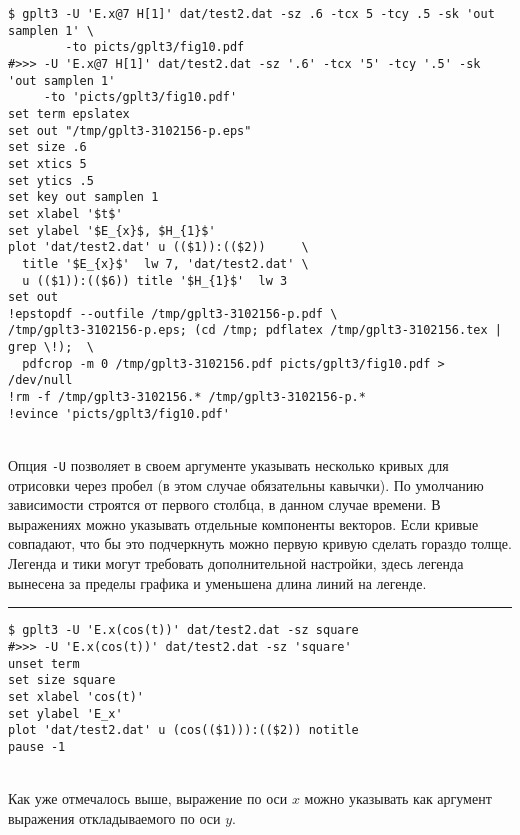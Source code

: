 \documentclass[12pt]{article}
\begin{document}
\vspace{3mm}
\noindent
\begin{minipage}[b]{.48\textwidth}
\small
\begin{verbatim}
$ gplt3 -U 'E.x@7 H[1]' dat/test2.dat -sz .6 -tcx 5 -tcy .5 -sk 'out samplen 1' \
        -to picts/gplt3/fig10.pdf
#>>> -U 'E.x@7 H[1]' dat/test2.dat -sz '.6' -tcx '5' -tcy '.5' -sk 'out samplen 1' 
     -to 'picts/gplt3/fig10.pdf'
set term epslatex 
set out "/tmp/gplt3-3102156-p.eps"
set size .6
set xtics 5
set ytics .5
set key out samplen 1
set xlabel '$t$'
set ylabel '$E_{x}$, $H_{1}$'
plot 'dat/test2.dat' u (($1)):(($2))     \
  title '$E_{x}$'  lw 7, 'dat/test2.dat' \
  u (($1)):(($6)) title '$H_{1}$'  lw 3 
set out
!epstopdf --outfile /tmp/gplt3-3102156-p.pdf \
/tmp/gplt3-3102156-p.eps; (cd /tmp; pdflatex /tmp/gplt3-3102156.tex | grep \!);  \
  pdfcrop -m 0 /tmp/gplt3-3102156.pdf picts/gplt3/fig10.pdf > /dev/null
!rm -f /tmp/gplt3-3102156.* /tmp/gplt3-3102156-p.*
!evince 'picts/gplt3/fig10.pdf'
\end{verbatim}
\end{minipage}
\raisebox{2cm}{\epsfig{file=picts/gplt3/fig10, width=.5\textwidth}}\\[5mm]
Опция \verb'-U' позволяет в своем аргументе указывать несколько кривых для отрисовки через пробел (в этом случае обязательны кавычки).
По умолчанию зависимости строятся от первого столбца, в данном случае времени. В выражениях можно указывать отдельные компоненты векторов.
Если кривые совпадают, что бы это подчеркнуть можно первую кривую сделать гораздо толще.
Легенда и тики могут требовать дополнительной настройки, здесь легенда вынесена за пределы графика и уменьшена длина линий на легенде.\\

\hrule %

\vspace{3mm}
\noindent
\begin{minipage}[b]{.73\textwidth}
\small
\begin{verbatim}
$ gplt3 -U 'E.x(cos(t))' dat/test2.dat -sz square
#>>> -U 'E.x(cos(t))' dat/test2.dat -sz 'square'
unset term
set size square
set xlabel 'cos(t)'
set ylabel 'E_x'
plot 'dat/test2.dat' u (cos(($1))):(($2)) notitle   
pause -1
\end{verbatim}
\end{minipage}
\\[5mm]
Как уже отмечалось выше, выражение по оси $x$  можно указывать как аргумент выражения откладываемого по оси $y$.
\end{document}

